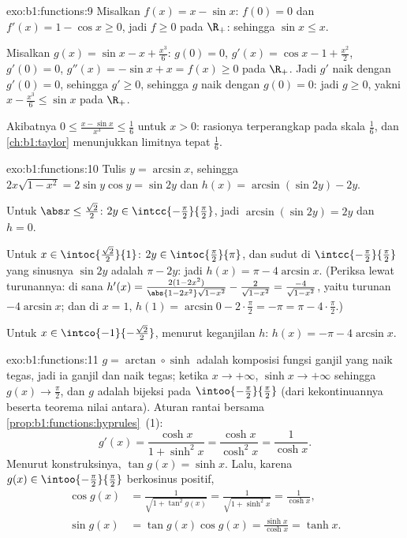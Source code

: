 \begin{solution}{exo:b1:functions:9}
Misalkan $f(x) = x - \sin x$: $f(0) = 0$ dan $f'(x) = 1 - \cos x \geq 0$,
jadi $f \geq 0$ pada $\R_+$: sehingga $\sin x \leq x$.

Misalkan $g(x) = \sin x - x + \frac{x^3}{6}$: $g(0) = 0$, $g'(x) = \cos x -
1 + \frac{x^2}{2}$, $g'(0) = 0$, $g''(x) = -\sin x + x = f(x) \geq 0$
pada $\R_+$. Jadi $g'$ naik dengan $g'(0) = 0$, sehingga $g' \geq 0$,
sehingga $g$ naik dengan $g(0) = 0$: jadi $g \geq 0$, yakni $x -
\frac{x^3}{6} \leq \sin x$ pada $\R_+$.

Akibatnya $0 \leq \frac{x - \sin x}{x^3} \leq \frac 16$ untuk $x >
0$: rasionya terperangkap pada skala $\frac16$, dan
\cref{ch:b1:taylor} menunjukkan limitnya tepat $\frac 16$.
\end{solution}

\begin{solution}{exo:b1:functions:10}
Tulis $y = \arcsin x$, sehingga $2x\sqrt{1 - x^2} = 2\sin y\cos y = \sin
2y$ dan $h(x) = \arcsin(\sin 2y) - 2y$.

Untuk $\abs x \leq \frac{\sqrt 2}{2}$: $2y \in
\intcc{-\frac\pi2}{\frac\pi2}$, jadi $\arcsin(\sin 2y) = 2y$ dan $h =
0$.

Untuk $x \in \intoc{\frac{\sqrt 2}{2}}{1}$: $2y \in
\intoc{\frac\pi2}{\pi}$, dan sudut di
$\intcc{-\frac\pi2}{\frac\pi2}$ yang sinusnya $\sin 2y$ adalah $\pi - 2y$:
jadi $h(x) = \pi - 4\arcsin x$. (Periksa lewat turunannya: di sana
$h'(x) = \frac{2(1 - 2x^2)}{\abs{1 - 2x^2}\sqrt{1 - x^2}} -
\frac{2}{\sqrt{1-x^2}} = \frac{-4}{\sqrt{1 - x^2}}$, yaitu turunan
$-4\arcsin x$; dan di $x = 1$, $h(1) = \arcsin 0 - 2\cdot\frac\pi2
= -\pi = \pi - 4\cdot\frac\pi2$.)

Untuk $x \in \intco{-1}{-\frac{\sqrt 2}{2}}$, menurut keganjilan $h$:
$h(x) = -\pi - 4\arcsin x$.
\end{solution}

\begin{solution}{exo:b1:functions:11}
$g = \arctan \circ \sinh$ adalah komposisi fungsi ganjil yang naik
tegas, jadi ia ganjil dan naik tegas; ketika $x \to
+\infty$, $\sinh x \to +\infty$ sehingga $g(x) \to \frac\pi2$, dan $g$ adalah
bijeksi pada $\intoo{-\frac\pi2}{\frac\pi2}$ (dari kekontinuannya beserta
teorema nilai antara). Aturan rantai bersama
\cref{prop:b1:functions:hyprules}~(1):
\[
g'(x) = \frac{\cosh x}{1 + \sinh^2 x} = \frac{\cosh x}{\cosh^2 x}
= \frac{1}{\cosh x} .
\]
Menurut konstruksinya, $\tan g(x) = \sinh x$. Lalu, karena $g(x) \in
\intoo{-\frac\pi2}{\frac\pi2}$ berkosinus positif,
\begin{align*}
\cos g(x) &= \frac{1}{\sqrt{1 + \tan^2 g(x)}}
= \frac{1}{\sqrt{1 + \sinh^2 x}} = \frac{1}{\cosh x},\\
\sin g(x) &= \tan g(x) \cos g(x) = \frac{\sinh x}{\cosh x} = \tanh x .
\end{align*}
\end{solution}

